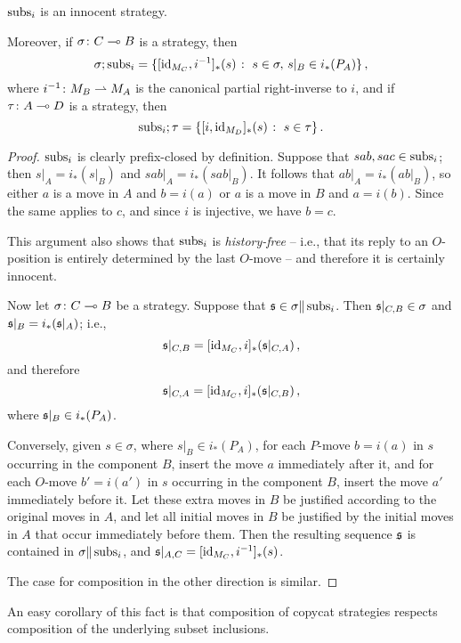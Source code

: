\begin{proposition}
  $\operatorname{subs}_i$ is an innocent strategy.

  Moreover, if $\sigma\colon C \multimap B$ is a strategy, then
  \[
    \sigma;\operatorname{subs}_i = \{[\operatorname{id}_{M_C},i^{-1}]_*(s)\;\colon\; s\in\sigma,\,s\vert_B\in i_*(P_A)\}\,,
    \]
  where $i^{-1}\colon M_B \rightharpoonup M_A$ is the canonical partial right-inverse to $i$, and if $\tau \colon A \multimap D$ is a strategy, then
  \[
    \operatorname{subs}_i;\tau = \{[i,\operatorname{id}_{M_D}]_*(s)\;\colon\; s\in\tau\}\,.
    \]
  \label{PropCopycat}
\end{proposition}
\begin{proof}
  $\operatorname{subs}_i$ is clearly prefix-closed by definition.  
  Suppose that $sab,sac\in\operatorname{subs}_i$; then $s\vert_A=i_*(s\vert_B)$ and $sab\vert_A=i_*(sab\vert_B)$.  
  It follows that $ab\vert_A=i_*(ab\vert_B)$, so either $a$ is a move in $A$ and $b=i(a)$ or $a$ is a move in $B$ and $a=i(b)$.  
  Since the same applies to $c$, and since $i$ is injective, we have $b=c$.

  This argument also shows that $\operatorname{subs}_i$ is \emph{history-free} -- i.e., that its reply to an $O$-position is entirely determined by the last $O$-move -- and therefore it is certainly innocent.

  Now let $\sigma \colon C \multimap B$ be a strategy.  
  Suppose that $\mathfrak s\in\sigma\|\operatorname{subs}_i$.  
  Then $\mathfrak s\vert_{C,B}\in\sigma$ and $\mathfrak s\vert_B=i_*(\mathfrak s\vert_A)$; i.e., 
  \[
    \mathfrak s\vert_{C,B}=[\operatorname{id}_{M_C},i]_*(\mathfrak s\vert_{C,A})\,,
    \]
  and therefore 
  \[
    \mathfrak s\vert_{C,A}=[\operatorname{id}_{M_C},i]_*(\mathfrak s\vert_{C,B})\,,
    \]
  where $\mathfrak s\vert_B\in i_*(P_A)$.

  Conversely, given $s\in\sigma$, where $s\vert_B\in i_*(P_A)$, for each $P$-move $b=i(a)$ in $s$ occurring in the component $B$, insert the move $a$ immediately after it, and for each $O$-move $b'=i(a')$ in $s$ occurring in the component $B$, insert the move $a'$ immediately before it.
  Let these extra moves in $B$ be justified according to the original moves in $A$, and let all initial moves in $B$ be justified by the initial moves in $A$ that occur immediately before them.
  Then the resulting sequence $\mathfrak s$ is contained in $\sigma\|\operatorname{subs}_i$, and $\mathfrak s\vert_{A,C}=[\operatorname{id}_{M_C},i^{-1}]_*(s)$.

  The case for composition in the other direction is similar.
\end{proof}

An easy corollary of this fact is that composition of copycat strategies respects composition of the underlying subset inclusions.

